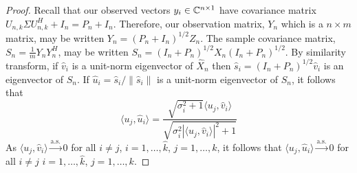 \begin{proof}
Recall that our observed vectors $y_i\in\mathbb{C}^{n\times 1}$ have covariance matrix $U_{n,k}\Sigma U_{n,k}^H+I_n=P_n+I_n$. Therefore, our observation matrix, $Y_n$ which is a $n\times m$ matrix, may be written $Y_n=\left(P_n+I_n\right)^{1/2}Z_n$. The sample covariance matrix, $S_n=\frac{1}{m}Y_nY_n^H$, may be written $S_n=\left(I_n+P_n\right)^{1/2}X_n\left(I_n+P_n\right)^{1/2}$. By similarity transform, if $\widehat{v}_i$ is a unit-norm eigenvector of $\widehat{X}_n$ then $\widehat{s}_i=\left(I_n+P_n\right)^{1/2}\widehat{v}_i$ is an eigenvector of $S_n$. If $\widehat{u}_i=\widehat{s}_i/\|\widehat{s}_i\|$ is a unit-norm eigenvector of $S_n$, it follows that
\begin{equation*}
\langle u_j,\widehat{u}_i\rangle=\frac{\sqrt{\sigma_i^2+1}\langle u_j,\widehat{v}_i\rangle}{\sqrt{\sigma_i^2|\langle u_j,\widehat{v}_i\rangle|^2+1}}
\end{equation*}
As $\langle u_j,\widehat{v}_i\rangle\overset{\text{a.s.}}{\longrightarrow}0$ for all $i\neq j$, $i=1,\dots,\widehat{k}$, $j=1,\dots,k$, it follows that $\langle u_j,\widehat{u}_i\rangle\overset{\text{a.s.}}{\longrightarrow}0$ for all $i\neq j$ $i=1,\dots,\widehat{k}$, $j=1,\dots,k$.
\end{proof}

